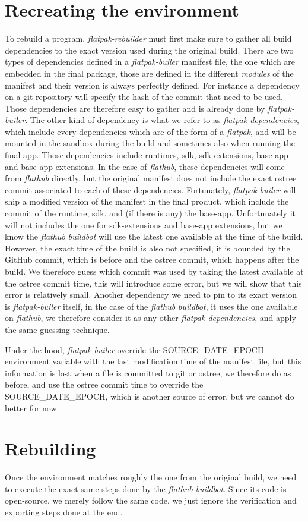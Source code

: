 \documentclass[a4paper,11pt,oneside]{report}
\theoremstyle{definition}
\newcommand{\sysname}{\emph{flatpak-rebuilder}\xspace}
\newcommand{\fp}{\emph{flatpak}\xspace}
\newcommand{\fh}{\emph{flathub}\xspace}
\newcommand{\fb}{\emph{flatpak-builer}\xspace}
\newcommand{\fdp}{\emph{flatpak dependencies}\xspace}
\newcommand{\sde}{SOURCE\_DATE\_EPOCH\xspace}
\newcommand{\fhbb}{\emph{flathub buildbot}\xspace}
\begin{document}
\section{Recreating the environment}
To rebuild a program, \sysname must first make sure to gather all build
dependencies to the exact version used during the original build. There are two
types of dependencies defined in a \fb manifest file, the one which are
embedded in the final package, those are defined in the different
\emph{modules} of the manifest and their version is always perfectly defined.
For instance a dependency on a git repository will specify the hash of the
commit that need to be used. Those dependencies are therefore easy to gather
and is already done by \fb.
The other kind of dependency is what we refer to as \fdp, which include every
dependencies which are of the form of a \fp, and will be mounted in the
sandbox during the build and sometimes also when running the final app. Those
dependencies include runtimes, sdk, sdk-extensions, base-app and base-app
extensions. In the case of \fh, these dependencies will come from \fh directly,
but the original manifest does not include the exact ostree commit associated
to each of these dependencies.
Fortunately, \fb will ship a modified version of the manifest in the final
product, which include the commit of the runtime, sdk, and (if there is any)
the base-app. Unfortunately it will not includes the one for sdk-extensions and
base-app extensions, but we know the \fhbb will use the latest one
available at the time of the build. However, the exact time of the build is
also not specified, it is bounded by the GitHub commit, which is before and the
ostree commit, which happens after the build.
We therefore guess which commit was used by taking the latest available at the
ostree commit time, this will introduce some error, but we will show that this
error is relatively small.
Another dependency we need to pin to its exact version is \fb itself, in the
case of the \fhbb, it uses the one available on \fh, we therefore
consider it as any other \fdp, and apply the same guessing technique.

Under the hood, \fb override the \sde environment variable with the last
modification time of the manifest file, but this information is lost when a
file is committed to git or ostree, we therefore do as before, and use the
ostree commit time to override the \sde, which is another source of error, but
we cannot do better for now.

\section{Rebuilding}
Once the environment matches roughly the one from the original build, we need
to execute the exact same steps done by the \fhbb. Since its code is
open-source, we merely follow the same code, we just ignore the verification
and exporting steps done at the end.
\end{document}
